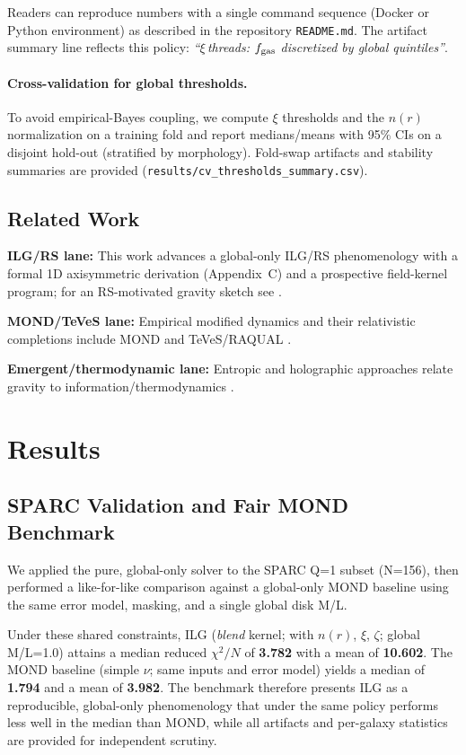 \documentclass[fleqn,usenatbib]{mnras}
\begin{document}
Readers can reproduce numbers with a single command sequence (Docker or Python environment) as described in the repository \texttt{README.md}. The artifact summary line reflects this policy: \emph{``$\xi$\,threads: $f_{\rm gas}$ discretized by global quintiles''}.

\paragraph{Cross-validation for global thresholds.} To avoid empirical-Bayes coupling, we compute $\xi$ thresholds and the $n(r)$ normalization on a training fold and report medians/means with 95\% CIs on a disjoint hold-out (stratified by morphology). Fold-swap artifacts and stability summaries are provided (\texttt{results/cv\_thresholds\_summary.csv}).

\subsection{Related Work}
\noindent \textbf{ILG/RS lane:} This work advances a global-only ILG/RS phenomenology with a formal 1D axisymmetric derivation (Appendix~C) and a prospective field-kernel program; for an RS-motivated gravity sketch see \citet{washburn2025gravityderived}.

\noindent \textbf{MOND/TeVeS lane:} Empirical modified dynamics and their relativistic completions include MOND and TeVeS/RAQUAL \citep{milgrom1983,bekenstein2004,famaey2012}.

\noindent \textbf{Emergent/thermodynamic lane:} Entropic and holographic approaches relate gravity to information/thermodynamics \citep{jacobson1995,verlinde2011,verlinde2017,hossenfelder2017}.

\section{Results}

\subsection{SPARC Validation and Fair MOND Benchmark}

We applied the pure, global-only solver to the SPARC Q=1 subset (N=156), then performed a like-for-like comparison against a global-only MOND baseline using the same error model, masking, and a single global disk M/L.

Under these shared constraints, ILG (\emph{blend} kernel; with $n(r)$, $\xi$, $\zeta$; global M/L=1.0) attains a median reduced $\chi^2/N$ of \textbf{3.782} with a mean of \textbf{10.602}. The MOND baseline (simple $\nu$; same inputs and error model) yields a median of \textbf{1.794} and a mean of \textbf{3.982}. The benchmark therefore presents ILG as a reproducible, global-only phenomenology that under the same policy performs less well in the median than MOND, while all artifacts and per-galaxy statistics are provided for independent scrutiny.
\end{document}
